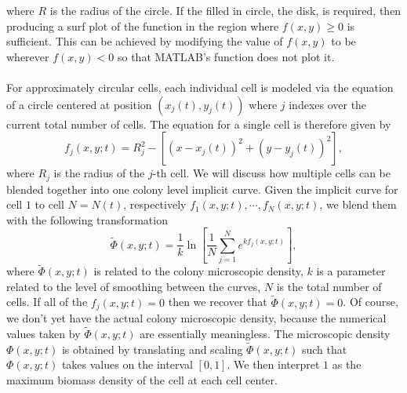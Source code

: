 where $R$ is the radius of the circle. If the filled in circle, the disk, is required, then producing a surf plot of the function in the region where $f(x,y) \geq 0$ is sufficient. This can be achieved by modifying the value of $f(x,y)$ to be  wherever $f(x,y)<0$ so that MATLAB's  function does not plot it.
\\
\\
For approximately circular cells, each individual cell is modeled via the equation of a circle centered at position $(x_j(t),y_j(t))$ where $j$ indexes over the current total number of cells. The equation for a single cell is therefore given by
\begin{equation*}
    f_j(x,y;t) =R_j^2- \left[ (x-x_j(t))^2 + (y-y_j(t))^2\right],
\end{equation*}
where $R_j$ is the radius of the $j$-th cell. We will discuss how multiple cells can be blended together into one colony level implicit curve. Given the implicit curve for cell $1$ to cell $N = N(t)$, respectively $f_1(x,y;t), \cdots, f_N(x,y; t)$, we blend them with the following transformation
\begin{equation*}
    \tilde{\Phi}(x,y;t) = \frac{1}{k}\ln{ \left[ \frac{1}{N} \sum_{j=1}^N{ e^{k f_j(x,y;t)}} \right]},
\end{equation*}
where $\tilde{\Phi}(x,y;t) $ is related to the colony microscopic density, $k$ is a 
parameter related to the level of smoothing between the curves, $N$ is the total number of cells. 
If all of the $f_j(x,y;t) =0$ then we recover that $\tilde{\Phi}(x,y;t) =0$. Of course, we don't yet have the actual colony microscopic density, because the numerical values taken by $\tilde{\Phi}(x,y;t) $ are essentially meaningless. The microscopic density $\Phi(x,y;t)$ is obtained by translating and scaling $\tilde{\Phi}(x,y;t) $ such that $\Phi(x,y;t) $ takes values on the interval $[0,1]$. We then interpret $1$ as the maximum biomass density of the cell at each cell center.

